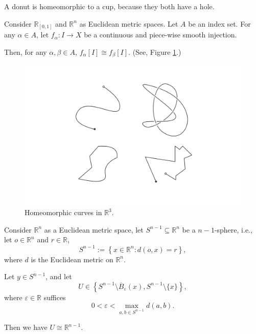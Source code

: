 \begin{example}
	A donut is homeomorphic to a cup, because they both have a hole.
\end{example}


\begin{example}
	Consider $\mathbb R_{[0,1]}$ and $\mathbb R^n$ as Euclidean metric spaces. Let $A$ be an index set. For any $\alpha \in A$, let $f_\alpha : I \to X$ be a continuous and piece-wise smooth injection.
	
	Then, for any $\alpha, \beta \in A$, $f_\alpha [I] \cong f_\beta[I]$. (See, Figure \ref{fig: homeomorphic curves}.)
\end{example}


\begin{figure}[h]
	\centering
	\includegraphics[width=345pt]{notes-for-general-topology/media/curves-and-knots}	
    \caption{Homeomorphic curves in $\mathbb R^3$.}
    \label{fig: homeomorphic curves}
\end{figure}


\begin{example}
	Consider $\mathbb R^n$ as a Euclidean metric space, let $S^{n-1} \subseteq \mathbb R^n$ be a $n-1$-sphere, i.e., let $o \in \mathbb R^n$ and $r \in \mathbb R$,
	$$
	S^{n-1} := \left\{ x \in \mathbb R^n : d(o,x) = r \right\},
	$$
	where $d$ is the Euclidean metric on $\mathbb R^n$.
	
	Let $y \in S^{n - 1}$, and let
	$$
	U \in \left\{ S^{n - 1} \setminus \overline B_\varepsilon (x), S^{n-1} \setminus \{x\} \right\},
	$$
	where $\varepsilon \in \mathbb R$ suffices
	$$
	0 < \varepsilon < \max_{a,b \in S^{n-1}} d(a,b).
	$$
	
	Then we have $U \cong \mathbb R^{n - 1}$.
\end{example}


